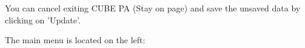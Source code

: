 \vspace{\baselineskip}

You can cancel exiting CUBE PA (Stay on page) and save the unsaved data by clicking on 'Update'.

\vspace{\baselineskip}

\pagebreak

The main menu is located on the left:

\vspace{\baselineskip}

\begin{figure}   %
  \vspace{-35pt}      %
  \begin{center}

\end{center}
\end{figure}

